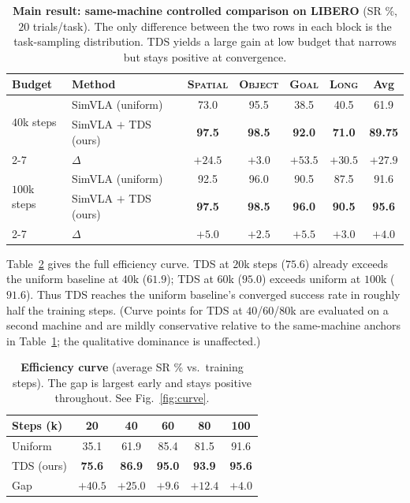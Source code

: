 \documentclass[letterpaper]{article} %
\newcommand{\tds}{TDS}
\begin{document}
\begin{table}[t]
\centering
\begin{tabular}{llccccc}
\toprule
Budget & Method & \textsc{Spatial} & \textsc{Object} & \textsc{Goal} & \textsc{Long} & Avg \\
\midrule
\multirow{2}{*}{$40$k steps}
& SimVLA (uniform) & 73.0 & 95.5 & 38.5 & 40.5 & 61.9 \\
& SimVLA $+$ \tds{} (ours) & \textbf{97.5} & \textbf{98.5} & \textbf{92.0} & \textbf{71.0} & \textbf{89.75} \\
\cmidrule(lr){2-7}
& $\Delta$ & $+24.5$ & $+3.0$ & $+53.5$ & $+30.5$ & $+27.9$ \\
\midrule
\multirow{2}{*}{$100$k steps}
& SimVLA (uniform) & 92.5 & 96.0 & 90.5 & 87.5 & 91.6 \\
& SimVLA $+$ \tds{} (ours) & \textbf{97.5} & \textbf{98.5} & \textbf{96.0} & \textbf{90.5} & \textbf{95.6} \\
\cmidrule(lr){2-7}
& $\Delta$ & $+5.0$ & $+2.5$ & $+5.5$ & $+3.0$ & $+4.0$ \\
\bottomrule
\end{tabular}
\caption{\textbf{Main result: same-machine controlled comparison on LIBERO} (SR \%, $20$ trials/task). The only difference between the two rows in each block is the task-sampling distribution. \tds{} yields a large gain at low budget that narrows but stays positive at convergence.}
\label{tab:main}
\end{table}

Table~\ref{tab:curve} gives the full efficiency curve. \tds{} at $20$k steps ($75.6$) already exceeds the uniform baseline at $40$k ($61.9$); \tds{} at $60$k ($95.0$) exceeds uniform at $100$k ($91.6$). Thus \tds{} reaches the uniform baseline's converged success rate in roughly half the training steps. (Curve points for \tds{} at $40$/$60$/$80$k are evaluated on a second machine and are mildly conservative relative to the same-machine anchors in Table~\ref{tab:main}; the qualitative dominance is unaffected.)

\begin{table}[t]
\centering
\setlength{\tabcolsep}{1.2mm}
\begin{tabular}{lccccc}
\toprule
Steps (k) & 20 & 40 & 60 & 80 & 100 \\
\midrule
Uniform & 35.1 & 61.9 & 85.4 & 81.5 & 91.6 \\
\tds{} (ours) & \textbf{75.6} & \textbf{86.9} & \textbf{95.0} & \textbf{93.9} & \textbf{95.6} \\
\midrule
Gap & $+40.5$ & $+25.0$ & $+9.6$ & $+12.4$ & $+4.0$ \\
\bottomrule
\end{tabular}
\caption{\textbf{Efficiency curve} (average SR \% vs.\ training steps). The gap is largest early and stays positive throughout. See Fig.~\ref{fig:curve}.}
\label{tab:curve}
\end{table}
\end{document}
